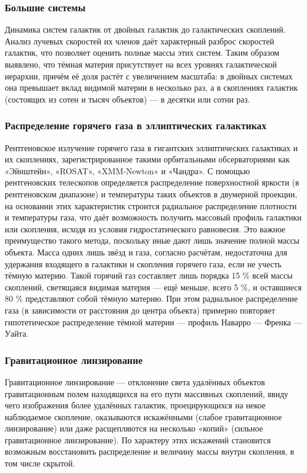 \subsubsection{Большие системы}
Динамика систем галактик от двойных галактик до галактических скоплений. Анализ лучевых скоростей их членов даёт характерный разброс скоростей галактик, что позволяет оценить полные массы этих систем. Таким образом выявлено, что тёмная материя присутствует на всех уровнях галактической иерархии, причём её доля растёт с увеличением масштаба: в двойных системах она превышает вклад видимой материи в несколько раз, а в скоплениях галактик (состоящих из сотен и тысяч объектов) — в десятки или сотни раз.
\subsubsection{Распределение горячего газа в эллиптических галактиках}
Рентгеновское излучение горячего газа в гигантских эллиптических галактиках и их скоплениях, зарегистрированное такими орбитальными обсерваториями как «Эйнштейн», «ROSAT», «XMM-Newton» и «Чандра». С помощью рентгеновских телескопов определяется распределение поверхностной яркости (в рентгеновском диапазоне) и температуры таких объектов в двумерной проекции, на основании этих характеристик строится радиальное распределение плотности и температуры газа, что даёт возможность получить массовый профиль галактики или скопления, исходя из условия гидростатического равновесия. Это важное преимущество такого метода, поскольку иные дают лишь значение полной массы объекта. Масса одних лишь звёзд и газа, согласно расчётам, недостаточна для удержания входящего в галактики и скопления горячего газа, если не учесть тёмную материю. Такой горячий газ составляет лишь порядка 15 \% всей массы скоплений, светящаяся видимая материя — ещё меньше, всего 5 \%, и оставшиеся 80 \% представляют собой тёмную материю. При этом радиальное распределение газа (в зависимости от расстояния до центра объекта) примерно повторяет гипотетическое распределение тёмной материи — профиль Наварро — Френка — Уайта.
\subsubsection{Гравитационное линзирование}
Гравитационное линзирование — отклонение света удалённых объектов гравитационным полем находящихся на его пути массивных скоплений, ввиду чего изображения более удалённых галактик, проецирующихся на некое наблюдаемое скопление, оказываются искажёнными (слабое гравитационное линзирование) или даже расщепляются на несколько «копий» (сильное гравитационное линзирование). По характеру этих искажений становится возможным восстановить распределение и величину массы внутри скопления, в том числе скрытой.
